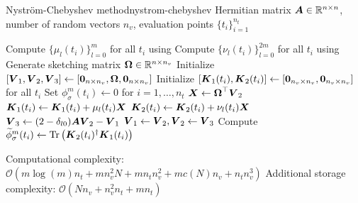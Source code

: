 \begin{algo}{Nystr\"om-Chebyshev method}{nystrom-chebyshev}
    Hermitian matrix $\boldsymbol{A} \in \mathbb{R}^{n \times n}$, number of random vectors $n_v$,
    evaluation points $\{t_i\}_{i=1}^{n_t}$
    \begin{algorithmic}[1]
        \State Compute $\{\mu_l(t_i)\}_{l=0}^m$ for all $t_i$ using 
        \State Compute $\{\nu_l(t_i)\}_{l=0}^{2m}$ for all $t_i$ using 
        \State Generate sketching matrix $\boldsymbol{\Omega} \in \mathbb{R}^{n \times n_v}$ %
        \State Initialize $[\boldsymbol{V}_1, \boldsymbol{V}_2, \boldsymbol{V}_3] \gets [\boldsymbol{0}_{n \times n_v}, \boldsymbol{\Omega}, \boldsymbol{0}_{n \times n_v}]$
        \State Initialize $[\boldsymbol{K}_1(t_i), \boldsymbol{K}_2(t_i)] \gets [\boldsymbol{0}_{n_v \times n_v}, \boldsymbol{0}_{n_v \times n_v}]$ for all $t_i$
        \State Set ${\phi}_{\sigma}^m(t_i) \gets 0$ for $i=1,\dots,n_t$
          \State $\boldsymbol{X} \gets \boldsymbol{\Omega}^{\top} \boldsymbol{V}_2$
                \State $\boldsymbol{K}_1(t_i) \gets \boldsymbol{K}_1(t_i) + \mu_l(t_i) \boldsymbol{X}$
            \EndIf
            \State $\boldsymbol{K}_2(t_i) \gets \boldsymbol{K}_2(t_i) + \nu_l(t_i) \boldsymbol{X}$
          \EndFor
          \State $\boldsymbol{V}_3 \gets (2 - \delta_{l0}) \boldsymbol{A} \boldsymbol{V}_2 - \boldsymbol{V}_1$ 
          \State $\boldsymbol{V}_1 \gets \boldsymbol{V}_2, \boldsymbol{V}_2 \gets \boldsymbol{V}_3$
        \EndFor
          \State Compute $\widetilde{\phi}_{\sigma}^m(t_i) \gets \operatorname{Tr}\left( \boldsymbol{K}_2(t_i)^{\dagger}\boldsymbol{K}_1(t_i) \right)$
        \EndFor
    \end{algorithmic}
\end{algo}

Computational complexity: $\mathcal{O}(m \log(m) n_t + m n_v^2 N + m n_t n_v^2 +  m c(N) n_v + n_t n_v^3)$
Additional storage complexity: $\mathcal{O}(N n_v + n_v^2 n_t + m n_t)$

